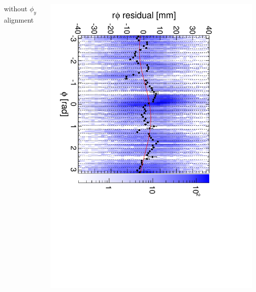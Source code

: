 \documentclass[compress]{beamer}
\begin{document}
\begin{frame}
\begin{columns}
\centering without $\phi_y$ alignment

\includegraphics[height=\linewidth, angle=90]{diskiter02_phiyzero_m2to1inner.pdf}
\end{columns}
\end{frame}
\end{document}
